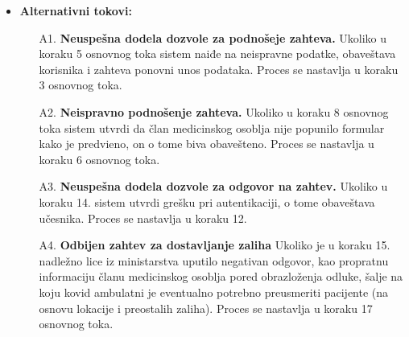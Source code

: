 \documentclass[titlepage]{article}
\begin{document}
\begin{itemize}
\begin{enumerate}
    \item \v{C}lan medicinskog osoblja popunjava formular i potvr\dj{}uje unos.
    \item Sistem proverava ispravnost popunjenog formulara.
    \item Sistem podnetom zahtevu dodeljuje identifikacioni broj. 
    \item Sistem zahtev prosle\dj{}uje nekom od lica iz ministarstva zadu\v{z}enom za slanje povratne informacije o mogu\v{c}nostima ispunjenja zahteva.
    \item Nadle\v{z}no lice ministarstva otvara stranicu za logovanje
    \item Sistem nadle\v{z}nom licu prikazuje stranicu i zahteva da se popune polja za ime, prezime, JMBG i poseban identifikacioni broj specijalno dodeljen za ovaj vid transakcija.
    \item Nadle\v{z}no lice ministarstva unosi podatke i potvr\dj{}uje unos.
    \item Sistem proverava validnost unetih podataka.
    \item Nadle\v{z}no lice iz ministarstva odgovara na zahtev.
    \item Kao propratna informacija \v{c}lanu medicinskog osoblja salje se vremenski interval (du\v{z}ine najvi\v{s}e 8 sati) u okviru kojeg se o\v{c}ekuje da transport zatra\v{z}enih zaliha bude realizovan.
    \item Identifikacioni broj zahteva, informacije o vremenu, zatra\v{z}enim zalihama, povratnoj informaciji, identitetu podnosioca zahteva kao i o  identitetu lica iz ministarstva zdravlja koje je na zahtev odgovorilo \v{c}uvaju se u sistemu.
 \end{enumerate}
 \item \textbf{Alternativni tokovi:}
 \begin{itemize}
            \item[A1.] \textbf{Neuspe\v{s}na dodela dozvole za podno\v{s}eje zahteva.} Ukoliko u koraku 5 osnovnog toka sistem naiđe na neispravne podatke, obaveštava korisnika i zahteva ponovni unos podataka. Proces se nastavlja u koraku 3 osnovnog toka.
            \item[A2.] \textbf{Neispravno podno\v{s}enje zahteva.} Ukoliko u koraku 8 osnovnog toka sistem utvrdi da \v{c}lan medicinskog osoblja nije popunilo formular kako je predvi\dj{}eno, on o tome biva obave\v{s}teno. Proces se nastavlja u koraku 6 osnovnog toka. 
            \item[A3.] \textbf{Neuspe\v{s}na dodela dozvole za odgovor na zahtev.} Ukoliko u koraku 14. sistem utvrdi gre\v{s}ku pri autentikaciji, o tome obave\v{s}tava u\v{c}esnika. Proces se nastavlja u koraku 12. 
            \item[A4.] \textbf{Odbijen zahtev za dostavljanje zaliha} Ukoliko je u koraku 15. nadle\v{z}no lice iz ministarstva uputilo negativan odgovor, kao propratnu informaciju \v{c}lanu medicinskog osoblja pored obrazlo\v{z}enja odluke, \v{s}alje na koju kovid ambulatni je eventualno potrebno preusmeriti pacijente (na osnovu lokacije i preostalih zaliha). Proces se nastavlja u koraku 17 osnovnog toka.
        \end{itemize}
\end{itemize}
\end{document}
